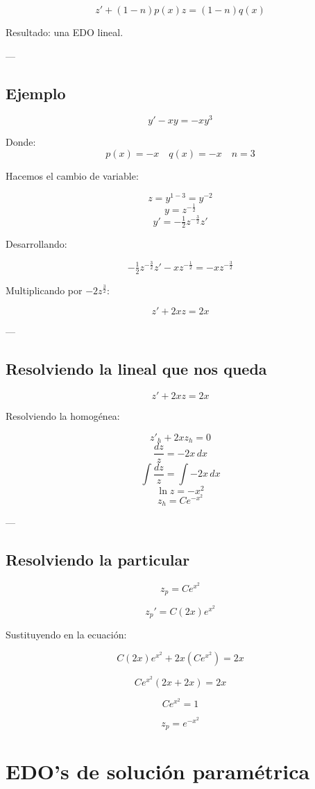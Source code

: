 \documentclass[a4paper,12pt]{article}
\begin{document}
\[
z' + (1 - n) p(x) z = (1 - n) q(x)
\]

Resultado: una EDO lineal.

---

\subsection*{Ejemplo}

\[
y' - xy = -x y^3
\]

Donde:
\[
p(x) = -x \quad q(x) = -x \quad n = 3
\]

Hacemos el cambio de variable:

\[
z = y^{1 - 3} = y^{-2}
\]
\[
y = z^{-\tfrac{1}{2}}
\]
\[
y' = -\tfrac{1}{2} z^{-\tfrac{3}{2}} z'
\]

Desarrollando:

\[
-\tfrac{1}{2} z^{-\tfrac{3}{2}} z' - x z^{-\tfrac{1}{2}} = -x z^{-\tfrac{3}{2}}
\]

Multiplicando por $-2 z^{\tfrac{3}{2}}$:

\[
z' + 2xz = 2x
\]

---

\subsection*{Resolviendo la lineal que nos queda}

\[
z' + 2xz = 2x
\]

Resolviendo la homogénea:

\[
z'_h + 2xz_h = 0
\]
\[
\frac{dz}{z} = -2x\, dx
\]
\[
\int \frac{dz}{z} = \int -2x\, dx
\]
\[
\ln z = -x^2
\]
\[
z_h = C e^{-x^2}
\]

---

\subsection*{Resolviendo la particular}

\[
z_p = C e^{x^2}
\]

\[
z_p' = C (2x) e^{x^2}
\]

Sustituyendo en la ecuación:

\[
C (2x) e^{x^2} + 2x (C e^{x^2}) = 2x
\]

\[
C e^{x^2} (2x + 2x) = 2x
\]

\[
C e^{x^2} = 1
\]

\[
z_p = e^{-x^2}
\]
\section*{EDO's de solución paramétrica}
\end{document}
